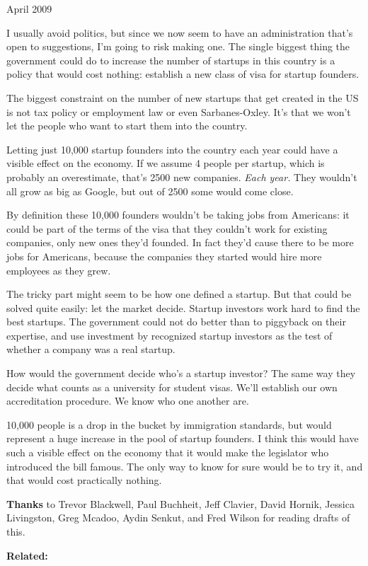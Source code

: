 April 2009

I usually avoid politics, but since we now seem to have an
administration that's open to suggestions, I'm going to risk making one.
The single biggest thing the government could do to increase the number
of startups in this country is a policy that would cost nothing:
establish a new class of visa for startup founders.

The biggest constraint on the number of new startups that get created in
the US is not tax policy or employment law or even Sarbanes-Oxley. It's
that we won't let the people who want to start them into the country.

Letting just 10,000 startup founders into the country each year could
have a visible effect on the economy. If we assume 4 people per startup,
which is probably an overestimate, that's 2500 new companies. \emph{Each
year.} They wouldn't all grow as big as Google, but out of 2500 some
would come close.

By definition these 10,000 founders wouldn't be taking jobs from
Americans: it could be part of the terms of the visa that they couldn't
work for existing companies, only new ones they'd founded. In fact
they'd cause there to be more jobs for Americans, because the companies
they started would hire more employees as they grew.

The tricky part might seem to be how one defined a startup. But that
could be solved quite easily: let the market decide. Startup investors
work hard to find the best startups. The government could not do better
than to piggyback on their expertise, and use investment by recognized
startup investors as the test of whether a company was a real startup.

How would the government decide who's a startup investor? The same way
they decide what counts as a university for student visas. We'll
establish our own accreditation procedure. We know who one another are.

10,000 people is a drop in the bucket by immigration standards, but
would represent a huge increase in the pool of startup founders. I think
this would have such a visible effect on the economy that it would make
the legislator who introduced the bill famous. The only way to know for
sure would be to try it, and that would cost practically nothing.

\textbf{Thanks} to Trevor Blackwell, Paul Buchheit, Jeff Clavier, David
Hornik, Jessica Livingston, Greg Mcadoo, Aydin Senkut, and Fred Wilson
for reading drafts of this.

\textbf{Related:}
